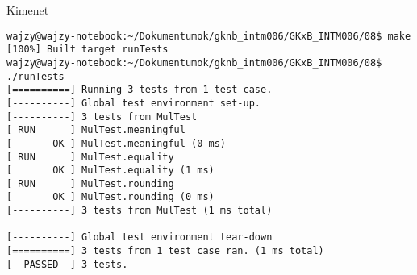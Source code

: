 \begin{frame}[fragile]
  \begin{block}{Kimenet}
    \scriptsize
    \begin{verbatim}
wajzy@wajzy-notebook:~/Dokumentumok/gknb_intm006/GKxB_INTM006/08$ make
[100%] Built target runTests
wajzy@wajzy-notebook:~/Dokumentumok/gknb_intm006/GKxB_INTM006/08$ ./runTests 
[==========] Running 3 tests from 1 test case.
[----------] Global test environment set-up.
[----------] 3 tests from MulTest
[ RUN      ] MulTest.meaningful
[       OK ] MulTest.meaningful (0 ms)
[ RUN      ] MulTest.equality
[       OK ] MulTest.equality (1 ms)
[ RUN      ] MulTest.rounding
[       OK ] MulTest.rounding (0 ms)
[----------] 3 tests from MulTest (1 ms total)

[----------] Global test environment tear-down
[==========] 3 tests from 1 test case ran. (1 ms total)
[  PASSED  ] 3 tests.
\end{verbatim}
  \end{block}
\end{frame}
